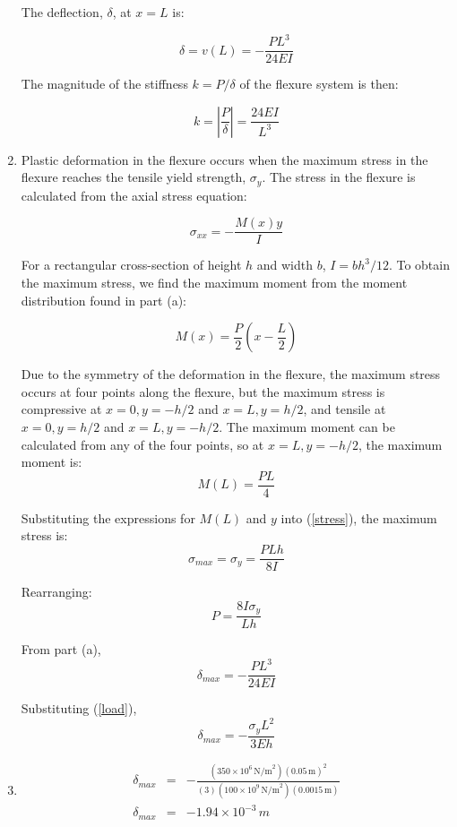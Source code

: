 \documentclass[11pt]{article}
\begin{document}
\begin{enumerate}
The deflection, $\delta$, at $x=L$ is:

$$ \delta = v(L)= -\frac{PL^3}{24EI} $$

The magnitude of the stiffness $k=P/\delta$ of the flexure system is
then:

$$ \boxed{k=\left|\frac{P}{\delta}\right|=\frac{24EI}{L^3}} $$

\item Plastic deformation in the flexure occurs when the
maximum stress in the flexure reaches the tensile yield strength,
$\sigma_y$.  The stress in the flexure is calculated from the axial
stress equation:

\begin{equation}
\sigma_{xx}=-\frac{M(x)y}{I}\label{stress}
\end{equation}

For a rectangular cross-section of height $h$ and width $b$,
$I=bh^3/12$.  To obtain the maximum stress, we find the maximum
moment from the moment distribution found in part (a):

\begin{equation*}
M(x)=\frac{P}{2}\left(x-\frac{L}{2}\right)
\end{equation*}

Due to the symmetry of the deformation in the flexure, the maximum
stress occurs at four points along the flexure, but the maximum
stress is compressive at $x=0, y=-h/2$ and $x=L, y=h/2$, and tensile
at $x=0, y=h/2$ and $x=L, y=-h/2$.  The maximum moment can be
calculated from any of the four points, so at $x=L, y=-h/2$, the
maximum moment is:
\begin{equation*}
M(L)=\frac{PL}{4}
\end{equation*}

Substituting the expressions for $M(L)$ and $y$ into (\ref{stress}),
the maximum stress is:
$$\sigma_{max}=\sigma_y=\frac{PLh}{8I}$$

Rearranging:
\begin{equation}
P=\frac{8I\sigma_y}{Lh} \label{load}
\end{equation}

From part (a),
$$ \delta_{max} = -\frac{PL^3}{24EI} $$

Substituting (\ref{load}),
$$ \boxed{\delta_{max} = -\frac{\sigma_{y}L^2}{3Eh}} $$

\item

\begin{eqnarray*}
\delta_{max} &=& - \frac{(350\times10^6 \, \text{N/m}^2) (0.05 \,
\text{m})^2}{(3)(100\times10^9 \, \text{N/m}^2)(0.0015 \,
\text{m})}  \\
\delta_{max} &=& \boxed{- 1.94\times10^{-3} \, m }
\end{eqnarray*}
\end{enumerate}
\end{document}
